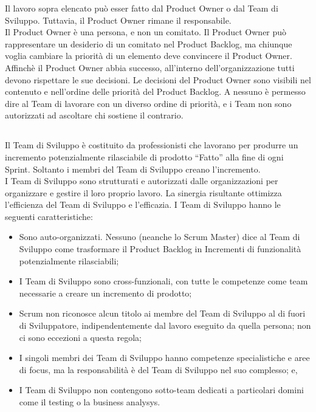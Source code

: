 \noindent Il lavoro sopra elencato pu\`o esser fatto dal Product Owner o dal Team di Sviluppo. Tuttavia, il Product Owner rimane il 
responsabile.  \newline
\\Il Product Owner \`e una persona, e non un comitato. Il Product Owner pu\`o rappresentare un desiderio di un comitato nel Product 
Backlog, ma chiunque voglia cambiare la priorit\`a di un elemento deve convincere il Product Owner. \newline
\\Affinch\`e il Product Owner abbia successo, all'interno dell'organizzazione tutti devono rispettare le sue decisioni. Le decisioni del 
Product Owner sono visibili nel contenuto e nell'ordine delle priorit\`a del Product Backlog. A nessuno \`e permesso dire al Team di 
lavorare con un diverso ordine di priorit\`a, e i Team non sono autorizzati ad ascoltare chi sostiene il contrario. 

\subsection*{\color{SteelBlue}{Il Team di Sviluppo}}%
\label{sec:development_team}
Il Team di Sviluppo \`e costituito da professionisti che lavorano per produrre un incremento potenzialmente rilasciabile di prodotto 
``Fatto'' alla fine di ogni Sprint. Soltanto i membri del Team di Sviluppo creano l'incremento. \newline
\\I Team di Sviluppo sono strutturati e autorizzati dalle organizzazioni per organizzare e gestire il loro proprio lavoro. La sinergia 
risultante ottimizza l'efficienza del Team di Sviluppo e l'efficazia. I Team di Sviluppo hanno le seguenti caratteristiche:

\begin{itemize}
	\item Sono auto-organizzati. Nessuno (neanche lo Scrum Master) dice al Team di Sviluppo come trasformare il Product Backlog in Incrementi di funzionalit\`a potenzialmente rilasciabili;
	\item I Team di Sviluppo sono cross-funzionali, con tutte le competenze come team necessarie a creare un incremento di prodotto;
	\item Scrum non riconosce alcun titolo ai membre del Team di Sviluppo al di fuori di Sviluppatore, indipendentemente dal lavoro 
	eseguito da quella persona; non ci sono eccezioni a questa regola;
	\item I singoli membri dei Team di Sviluppo hanno competenze specialistiche e aree di focus, ma la responsabilit\`a \`e del Team di 
	Sviluppo nel suo complesso; e,
	\item I Team di Sviluppo non contengono sotto-team dedicati a particolari domini come il testing o la business analysys.
\end{itemize}

